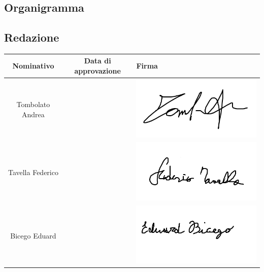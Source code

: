 \documentclass[PianoProgetto.tex]{subfiles}
\begin{document}
\begin{appendices}
\section{Organigramma}
	\subsection{Redazione}
		\begin{table}[h]
		\begin{tabularx}{\textwidth}{C C X}
			\toprule
			\textbf{Nominativo} & \textbf{Data di approvazione} & \textbf{Firma} \\
			\midrule
			Tombolato Andrea &  & \includegraphics[scale=0.19, trim=0 2cm 0 0cm]{firme_componenti/atombola_firma} \\[1ex]
			\midrule
			Tavella Federico &  & \includegraphics[scale=0.3, trim=0 2cm 0 0.3cm]{firme_componenti/ftavella_firma} \\[1ex]
			\midrule
			Bicego Eduard &  & \includegraphics[scale=0.4, trim=0 3cm 0 0.1cm]{firme_componenti/edubic_firma} \\[1ex]
			\bottomrule
		\end{tabularx}
		

\end{table}
\end{appendices}
\end{document}
